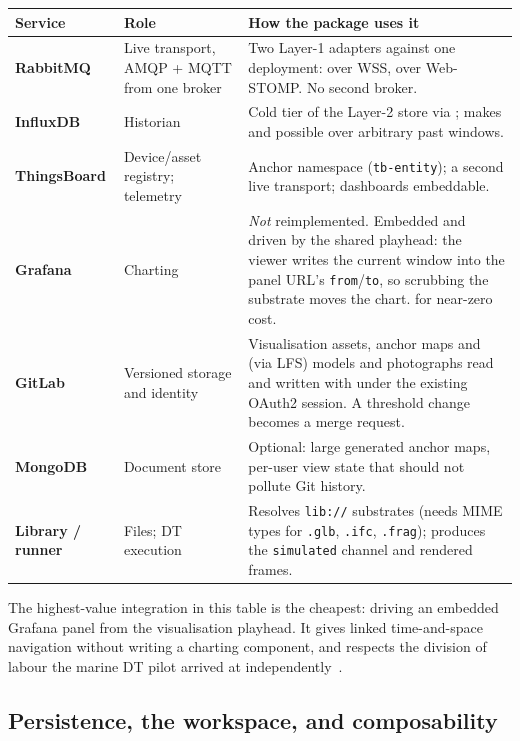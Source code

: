\begin{longtable}{@{}L{2.5cm}L{3.9cm}L{8.0cm}@{}}
\toprule
\textbf{Service} & \textbf{Role} & \textbf{How the package uses it} \\
\midrule
\endhead
\textbf{RabbitMQ} & Live transport, AMQP + MQTT from one broker & Two Layer-1 adapters
against one deployment:  over WSS,  over Web-STOMP. No
second broker. \\
\addlinespace
\textbf{InfluxDB} & Historian & Cold tier of the Layer-2 store via
; makes  and  possible over arbitrary
past windows. \\
\addlinespace
\textbf{ThingsBoard} & Device/asset registry; telemetry & Anchor namespace
(\texttt{tb-entity}); a second live transport; dashboards embeddable. \\
\addlinespace
\textbf{Grafana} & Charting & \emph{Not} reimplemented. Embedded and driven by the
shared playhead: the viewer writes the current window into the panel URL's
\texttt{from}/\texttt{to}, so scrubbing the substrate moves the chart.  for
near-zero cost. \\
\addlinespace
\textbf{GitLab} & Versioned storage and identity & Visualisation assets, anchor maps and
(via LFS) models and photographs read and written with  under the
existing OAuth2 session. A threshold change becomes a merge request. \\
\addlinespace
\textbf{MongoDB} & Document store & Optional: large generated anchor maps, per-user view
state that should not pollute Git history. \\
\addlinespace
\textbf{Library / runner} & Files; DT execution & Resolves \texttt{lib://} substrates
(needs MIME types for \texttt{.glb}, \texttt{.ifc}, \texttt{.frag}); produces the
\texttt{simulated} channel and rendered frames. \\
\bottomrule
\end{longtable}

\begin{keypoint}
The highest-value integration in this table is the cheapest: driving an embedded Grafana
panel from the visualisation playhead. It gives linked time-and-space navigation without
writing a charting component, and respects the division of labour the marine DT pilot
arrived at independently~\citep{vasilijevic2024trondheim}.
\end{keypoint}

\subsection{Persistence, the workspace, and composability}
\label{sec:workspace}

